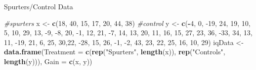 \documentclass[
  ignorenonframetext,
]{beamer}
\newenvironment{Shaded}{\begin{snugshade}}{\end{snugshade}}
\newcommand{\CommentTok}[1]{\textcolor[rgb]{0.56,0.35,0.01}{\textit{#1}}}
\newcommand{\DataTypeTok}[1]{\textcolor[rgb]{0.13,0.29,0.53}{#1}}
\newcommand{\DecValTok}[1]{\textcolor[rgb]{0.00,0.00,0.81}{#1}}
\newcommand{\KeywordTok}[1]{\textcolor[rgb]{0.13,0.29,0.53}{\textbf{#1}}}
\newcommand{\NormalTok}[1]{#1}
\newcommand{\OperatorTok}[1]{\textcolor[rgb]{0.81,0.36,0.00}{\textbf{#1}}}
\newcommand{\StringTok}[1]{\textcolor[rgb]{0.31,0.60,0.02}{#1}}
\begin{document}
\begin{frame}[fragile]{Spurters/Control Data}
\protect\hypertarget{spurterscontrol-data}{}

\begin{Shaded}
\begin{Highlighting}[]
\CommentTok{#spurters}
\NormalTok{x <-}\StringTok{ }\KeywordTok{c}\NormalTok{(}\DecValTok{18}\NormalTok{, }\DecValTok{40}\NormalTok{, }\DecValTok{15}\NormalTok{, }\DecValTok{17}\NormalTok{, }\DecValTok{20}\NormalTok{, }\DecValTok{44}\NormalTok{, }\DecValTok{38}\NormalTok{)}
\CommentTok{#control}
\NormalTok{y <-}\StringTok{ }\KeywordTok{c}\NormalTok{(}\OperatorTok{-}\DecValTok{4}\NormalTok{, }\DecValTok{0}\NormalTok{, }\DecValTok{-19}\NormalTok{, }\DecValTok{24}\NormalTok{, }\DecValTok{19}\NormalTok{, }\DecValTok{10}\NormalTok{, }\DecValTok{5}\NormalTok{, }\DecValTok{10}\NormalTok{,}
      \DecValTok{29}\NormalTok{, }\DecValTok{13}\NormalTok{, }\DecValTok{-9}\NormalTok{, }\DecValTok{-8}\NormalTok{, }\DecValTok{20}\NormalTok{, }\DecValTok{-1}\NormalTok{, }\DecValTok{12}\NormalTok{, }\DecValTok{21}\NormalTok{,}
      \DecValTok{-7}\NormalTok{, }\DecValTok{14}\NormalTok{, }\DecValTok{13}\NormalTok{, }\DecValTok{20}\NormalTok{, }\DecValTok{11}\NormalTok{, }\DecValTok{16}\NormalTok{, }\DecValTok{15}\NormalTok{, }\DecValTok{27}\NormalTok{,}
      \DecValTok{23}\NormalTok{, }\DecValTok{36}\NormalTok{, }\DecValTok{-33}\NormalTok{, }\DecValTok{34}\NormalTok{, }\DecValTok{13}\NormalTok{, }\DecValTok{11}\NormalTok{, }\DecValTok{-19}\NormalTok{, }\DecValTok{21}\NormalTok{,}
      \DecValTok{6}\NormalTok{, }\DecValTok{25}\NormalTok{, }\DecValTok{30}\NormalTok{,}\DecValTok{22}\NormalTok{, }\DecValTok{-28}\NormalTok{, }\DecValTok{15}\NormalTok{, }\DecValTok{26}\NormalTok{, }\DecValTok{-1}\NormalTok{, }\DecValTok{-2}\NormalTok{,}
      \DecValTok{43}\NormalTok{, }\DecValTok{23}\NormalTok{, }\DecValTok{22}\NormalTok{, }\DecValTok{25}\NormalTok{, }\DecValTok{16}\NormalTok{, }\DecValTok{10}\NormalTok{, }\DecValTok{29}\NormalTok{)}
\NormalTok{iqData <-}\StringTok{ }\KeywordTok{data.frame}\NormalTok{(}\DataTypeTok{Treatment =} 
      \KeywordTok{c}\NormalTok{(}\KeywordTok{rep}\NormalTok{(}\StringTok{"Spurters"}\NormalTok{, }\KeywordTok{length}\NormalTok{(x)),}
      \KeywordTok{rep}\NormalTok{(}\StringTok{"Controls"}\NormalTok{, }\KeywordTok{length}\NormalTok{(y))),}
      \DataTypeTok{Gain =} \KeywordTok{c}\NormalTok{(x, y))}
\end{Highlighting}
\end{Shaded}

\end{frame}
\end{document}
